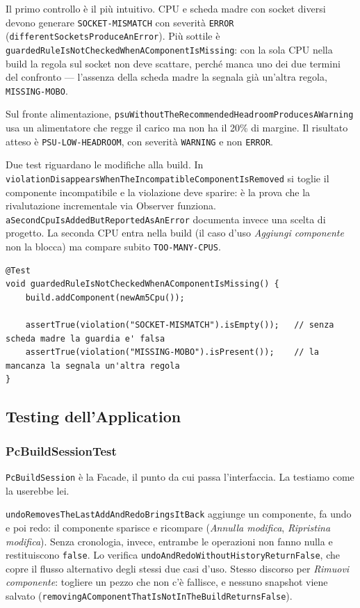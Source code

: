 \documentclass[12pt,a4paper]{article}
\begin{document}
Il primo controllo è il più intuitivo. CPU e scheda madre con socket diversi devono generare
\texttt{SOCKET-MISMATCH} con severità \texttt{ERROR} (\texttt{differentSocketsProduceAnError}). Più
sottile è \texttt{guardedRuleIsNotCheckedWhenAComponentIsMissing}: con la sola CPU nella build la regola
sul socket non deve scattare, perché manca uno dei due termini del confronto --- l'assenza della scheda
madre la segnala già un'altra regola, \texttt{MISSING-MOBO}.

Sul fronte alimentazione, \texttt{psuWithoutTheRecommendedHeadroomProducesAWarning} usa un alimentatore
che regge il carico ma non ha il 20\% di margine. Il risultato atteso è \texttt{PSU-LOW-HEADROOM}, con
severità \texttt{WARNING} e non \texttt{ERROR}.

Due test riguardano le modifiche alla build. In
\texttt{violationDisappearsWhenTheIncompatibleComponentIsRemoved} si toglie il componente incompatibile e
la violazione deve sparire: è la prova che la rivalutazione incrementale via Observer funziona.
\texttt{aSecondCpuIsAddedButReportedAsAnError} documenta invece una scelta di progetto. La seconda CPU
entra nella build (il caso d'uso \emph{Aggiungi componente} non la blocca) ma compare subito
\texttt{TOO-MANY-CPUS}.

\begin{lstlisting}[style=intellijlight, caption={Test di una regola con guardia in CompatibilityCheckerTest}, label={lst:test-guardia}]
@Test
void guardedRuleIsNotCheckedWhenAComponentIsMissing() {
    build.addComponent(newAm5Cpu());

    assertTrue(violation("SOCKET-MISMATCH").isEmpty());   // senza scheda madre la guardia e' falsa
    assertTrue(violation("MISSING-MOBO").isPresent());    // la mancanza la segnala un'altra regola
}
\end{lstlisting}

\subsection{Testing dell'Application}

\subsubsection{PcBuildSessionTest}
\texttt{PcBuildSession} è la Facade, il punto da cui passa l'interfaccia. La testiamo come la userebbe
lei.

\texttt{undoRemovesTheLastAddAndRedoBringsItBack} aggiunge un componente, fa undo e poi redo: il
componente sparisce e ricompare (\emph{Annulla modifica}, \emph{Ripristina modifica}). Senza cronologia,
invece, entrambe le operazioni non fanno nulla e restituiscono \texttt{false}. Lo verifica
\texttt{undoAndRedoWithoutHistoryReturnFalse}, che copre il flusso alternativo degli stessi due casi
d'uso. Stesso discorso per \emph{Rimuovi componente}: togliere un pezzo che non c'è fallisce, e nessuno
snapshot viene salvato (\texttt{removingAComponentThatIsNotInTheBuildReturnsFalse}).
\end{document}
